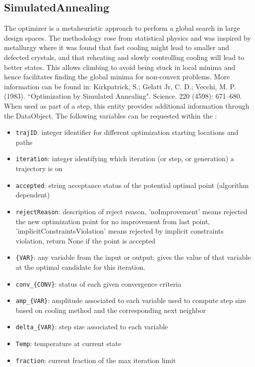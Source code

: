 \subsection{SimulatedAnnealing}
  The  optimizer is a metaheuristic approach
  to perform a global search in large design spaces. The methodology rose
  from statistical physics and was inspired by metallurgy where                             it was
  found that fast cooling might lead to smaller and defected crystals,
  and that reheating and slowly controlling cooling will lead to better states.
  This allows climbing to avoid being stuck in local minima and hence facilitates
  finding the global minima for non-convex problems.                             More information
  can be found in: Kirkpatrick, S.; Gelatt Jr, C. D.; Vecchi, M. P. (1983).
  ``Optimization by Simulated Annealing". Science. 220 (4598): 671–680.
\vspace{7pt} \\When used as part of a  step, this entity provides
        additional information through the  DataObject. The
        following variables can be requested within the :
        \begin{itemize}
          \item \texttt{trajID}: integer identifier for different optimization starting locations and paths
             \item \texttt{iteration}: integer identifying which iteration (or step, or generation) a trajectory is on
             \item \texttt{accepted}: string acceptance status of the potential optimal point (algorithm dependent)
             \item \texttt{rejectReason}: description of reject reason, 'noImprovement' means rejected the new optimization point for no improvement from last point, 'implicitConstraintsViolation' means rejected by implicit constraints violation, return None if the point is accepted
             \item \texttt{\{VAR\}}: any variable from the  input or output; gives the value of that variable at the optimal candidate for this iteration.
             \item \texttt{conv\_\{CONV\}}: status of each given convergence criteria
             \item \texttt{amp\_\{VAR\}}: amplitude associated to each variable used to compute step size based on cooling method and the corresponding next neighbor
             \item \texttt{delta\_\{VAR\}}: step size associated to each variable
             \item \texttt{Temp}: temperature at current state
             \item \texttt{fraction}: current fraction of the max iteration limit
           
         \end{itemize}

